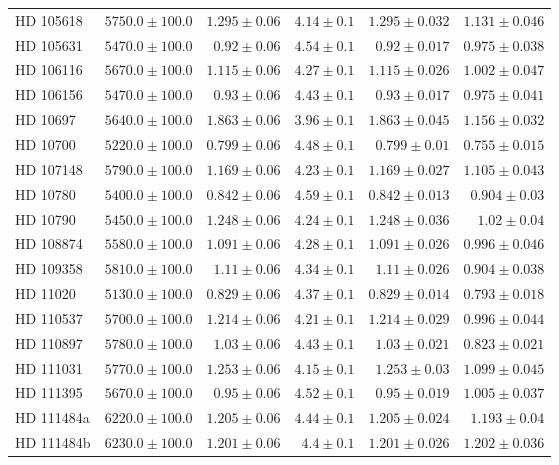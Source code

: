 \begin{longtable*}{lrrrrr}
HD 105618 & $5750.0\pm 100.0$ & $1.295\pm 0.06$ & $4.14\pm 0.1$ & $1.295\pm 0.032$ & $1.131\pm 0.046$ \\ 
HD 105631 & $5470.0\pm 100.0$ & $0.92\pm 0.06$ & $4.54\pm 0.1$ & $0.92\pm 0.017$ & $0.975\pm 0.038$ \\ 
HD 106116 & $5670.0\pm 100.0$ & $1.115\pm 0.06$ & $4.27\pm 0.1$ & $1.115\pm 0.026$ & $1.002\pm 0.047$ \\ 
HD 106156 & $5470.0\pm 100.0$ & $0.93\pm 0.06$ & $4.43\pm 0.1$ & $0.93\pm 0.017$ & $0.975\pm 0.041$ \\ 
HD 10697 & $5640.0\pm 100.0$ & $1.863\pm 0.06$ & $3.96\pm 0.1$ & $1.863\pm 0.045$ & $1.156\pm 0.032$ \\ 
HD 10700 & $5220.0\pm 100.0$ & $0.799\pm 0.06$ & $4.48\pm 0.1$ & $0.799\pm 0.01$ & $0.755\pm 0.015$ \\ 
HD 107148 & $5790.0\pm 100.0$ & $1.169\pm 0.06$ & $4.23\pm 0.1$ & $1.169\pm 0.027$ & $1.105\pm 0.043$ \\ 
HD 10780 & $5400.0\pm 100.0$ & $0.842\pm 0.06$ & $4.59\pm 0.1$ & $0.842\pm 0.013$ & $0.904\pm 0.03$ \\ 
HD 10790 & $5450.0\pm 100.0$ & $1.248\pm 0.06$ & $4.24\pm 0.1$ & $1.248\pm 0.036$ & $1.02\pm 0.04$ \\ 
HD 108874 & $5580.0\pm 100.0$ & $1.091\pm 0.06$ & $4.28\pm 0.1$ & $1.091\pm 0.026$ & $0.996\pm 0.046$ \\ 
HD 109358 & $5810.0\pm 100.0$ & $1.11\pm 0.06$ & $4.34\pm 0.1$ & $1.11\pm 0.026$ & $0.904\pm 0.038$ \\ 
HD 11020 & $5130.0\pm 100.0$ & $0.829\pm 0.06$ & $4.37\pm 0.1$ & $0.829\pm 0.014$ & $0.793\pm 0.018$ \\ 
HD 110537 & $5700.0\pm 100.0$ & $1.214\pm 0.06$ & $4.21\pm 0.1$ & $1.214\pm 0.029$ & $0.996\pm 0.044$ \\ 
HD 110897 & $5780.0\pm 100.0$ & $1.03\pm 0.06$ & $4.43\pm 0.1$ & $1.03\pm 0.021$ & $0.823\pm 0.021$ \\ 
HD 111031 & $5770.0\pm 100.0$ & $1.253\pm 0.06$ & $4.15\pm 0.1$ & $1.253\pm 0.03$ & $1.099\pm 0.045$ \\ 
HD 111395 & $5670.0\pm 100.0$ & $0.95\pm 0.06$ & $4.52\pm 0.1$ & $0.95\pm 0.019$ & $1.005\pm 0.037$ \\ 
HD 111484a & $6220.0\pm 100.0$ & $1.205\pm 0.06$ & $4.44\pm 0.1$ & $1.205\pm 0.024$ & $1.193\pm 0.04$ \\ 
HD 111484b & $6230.0\pm 100.0$ & $1.201\pm 0.06$ & $4.4\pm 0.1$ & $1.201\pm 0.026$ & $1.202\pm 0.036$ \\ 

\end{longtable*}

